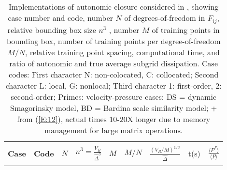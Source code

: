 \begin{table}[tb]
	\label{tab:1}
	\centering

	\caption{Implementations of autonomic closure considered in , showing case number and code, number $N$ of degrees-of-freedom in $F_{ij}$, relative bounding box size $n^3$ , number $M$ of training points in bounding box, number of training points per degree-of-freedom $M/N$, relative training point spacing, computational time, and ratio of autonomic and true average subgrid dissipation. Case codes: First character N: non-colocated, C: collocated; Second character L: local, G: nonlocal; Third character 1: first-order, 2: second-order; Primes: velocity-pressure cases; DS = dynamic Smagorinsky model, BD = Bardina scale similarity model; + from (\ref{E:12}), actual times 10-20X longer due to memory management for large matrix operations. \vspace{0.5cm}}

	\begin{tabular}{clrcrrcrr}
	\hline \\

	\textbf{Case} & \textbf{Code} & $N$ & $n^3 = \frac{V_B}{\widehat{\Delta}^3}$ & $M$ & $M/N$ & $\frac{(V_B/M)^{1/3}}{\widehat{\Delta}}$ & t(s) & $\frac{\langle P^F \rangle}{\langle P \rangle}$ \\ \\


\end{tabular}
\end{table}
